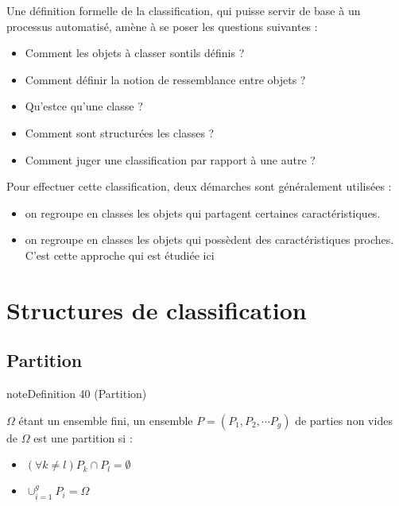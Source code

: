 \documentclass[letterpaper,10pt,english]{jupyterBook}
\begin{document}
\sphinxAtStartPar
Une définition formelle de la classification, qui puisse servir de base à un processus automatisé, amène à se poser les questions suivantes :
\begin{itemize}
\item {} 
\sphinxAtStartPar
Comment les objets à classer sont\sphinxhyphen{}ils définis ?

\item {} 
\sphinxAtStartPar
Comment définir la notion de ressemblance entre objets ?

\item {} 
\sphinxAtStartPar
Qu’est\sphinxhyphen{}ce qu’une classe ?

\item {} 
\sphinxAtStartPar
Comment sont structurées les classes ?

\item {} 
\sphinxAtStartPar
Comment juger une classification par rapport à une autre ?

\end{itemize}

\sphinxAtStartPar
Pour effectuer cette classification, deux démarches sont généralement utilisées :
\begin{itemize}
\item {} 
\sphinxAtStartPar
on regroupe en classes les objets qui partagent certaines caractéristiques.

\item {} 
\sphinxAtStartPar
on regroupe en classes les objets qui possèdent des caractéristiques proches. C’est cette approche qui est étudiée ici

\end{itemize}


\section{Structures de classification}
\label{\detokenize{clustering:structures-de-classification}}

\subsection{Partition}
\label{\detokenize{clustering:partition}}
\ignorespaces \label{clustering:definition-0}
\begin{sphinxadmonition}{note}{Definition 40 (Partition)}



\sphinxAtStartPar
\(\Omega\) étant un ensemble fini, un ensemble \(P =(P_1 ,P_2 ,\cdots  P_g )\) de parties non vides de   \(\Omega\) est une partition si :
\begin{itemize}
\item {} 
\sphinxAtStartPar
\((\forall k\neq l) P_k \cap P_l=\emptyset\)

\item {} 
\sphinxAtStartPar
\(\displaystyle\cup_{i=1}^gP_i=\Omega\)

\end{itemize}
\end{sphinxadmonition}
\end{document}
